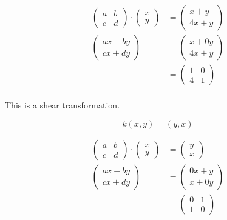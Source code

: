 \documentclass{tufte-handout}
\begin{document}
\begin{question}
\begin{align*}
    \begin{pmatrix}
        a & b \\
        c & d
    \end{pmatrix}
    \cdot
    \begin{pmatrix}
        x \\
        y
    \end{pmatrix}
    &=
    \begin{pmatrix}
        x + y\\
        4x + y
    \end{pmatrix}\\[8pt]
    \begin{pmatrix}
        ax + by \\
        cx + dy
    \end{pmatrix}
    &=
    \begin{pmatrix}
        x + 0y\\
        4x + y
    \end{pmatrix}\\[8pt]
    &=
    \begin{pmatrix}
        1 & 0\\
        4 & 1
    \end{pmatrix}\\
\end{align*}

This is a shear transformation.

\vspace{3cm}
\qsubpart

\[ k(x,y) = (y,x) \]

\begin{align*}
    \begin{pmatrix}
        a & b \\
        c & d
    \end{pmatrix}
    \cdot
    \begin{pmatrix}
        x \\
        y
    \end{pmatrix}
    &=
    \begin{pmatrix}
        y\\
        x
    \end{pmatrix}\\[8pt]
    \begin{pmatrix}
        ax + by \\
        cx + dy
    \end{pmatrix}
    &=
    \begin{pmatrix}
        0x + y\\
        x + 0y
    \end{pmatrix}\\[8pt]
    &=
    \begin{pmatrix}
        0 & 1\\
        1 & 0
    \end{pmatrix}\\
\end{align*}


\end{question}
\end{document}
